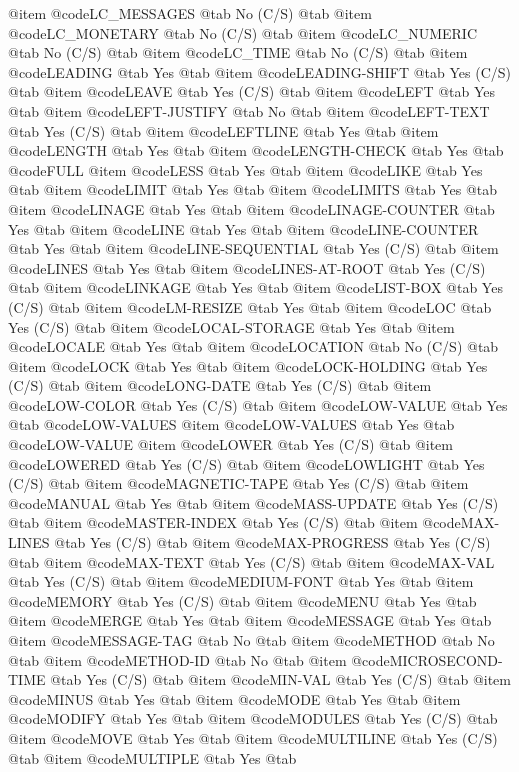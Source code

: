@item @code{LC_MESSAGES} @tab No	(C/S) @tab 
@item @code{LC_MONETARY} @tab No	(C/S) @tab 
@item @code{LC_NUMERIC} @tab No	(C/S) @tab 
@item @code{LC_TIME} @tab No	(C/S) @tab 
@item @code{LEADING} @tab Yes @tab 
@item @code{LEADING-SHIFT} @tab Yes	(C/S) @tab 
@item @code{LEAVE} @tab Yes	(C/S) @tab 
@item @code{LEFT} @tab Yes @tab 
@item @code{LEFT-JUSTIFY} @tab No @tab 
@item @code{LEFT-TEXT} @tab Yes	(C/S) @tab 
@item @code{LEFTLINE} @tab Yes @tab 
@item @code{LENGTH} @tab Yes @tab 
@item @code{LENGTH-CHECK} @tab Yes @tab @code{FULL}
@item @code{LESS} @tab Yes @tab 
@item @code{LIKE} @tab Yes @tab 
@item @code{LIMIT} @tab Yes @tab 
@item @code{LIMITS} @tab Yes @tab 
@item @code{LINAGE} @tab Yes @tab 
@item @code{LINAGE-COUNTER} @tab Yes @tab 
@item @code{LINE} @tab Yes @tab 
@item @code{LINE-COUNTER} @tab Yes @tab 
@item @code{LINE-SEQUENTIAL} @tab Yes	(C/S) @tab 
@item @code{LINES} @tab Yes @tab 
@item @code{LINES-AT-ROOT} @tab Yes	(C/S) @tab 
@item @code{LINKAGE} @tab Yes @tab 
@item @code{LIST-BOX} @tab Yes	(C/S) @tab 
@item @code{LM-RESIZE} @tab Yes @tab 
@item @code{LOC} @tab Yes	(C/S) @tab 
@item @code{LOCAL-STORAGE} @tab Yes @tab 
@item @code{LOCALE} @tab Yes @tab 
@item @code{LOCATION} @tab No	(C/S) @tab 
@item @code{LOCK} @tab Yes @tab 
@item @code{LOCK-HOLDING} @tab Yes	(C/S) @tab 
@item @code{LONG-DATE} @tab Yes	(C/S) @tab 
@item @code{LOW-COLOR} @tab Yes	(C/S) @tab 
@item @code{LOW-VALUE} @tab Yes @tab @code{LOW-VALUES}
@item @code{LOW-VALUES} @tab Yes @tab @code{LOW-VALUE}
@item @code{LOWER} @tab Yes	(C/S) @tab 
@item @code{LOWERED} @tab Yes	(C/S) @tab 
@item @code{LOWLIGHT} @tab Yes	(C/S) @tab 
@item @code{MAGNETIC-TAPE} @tab Yes	(C/S) @tab 
@item @code{MANUAL} @tab Yes @tab 
@item @code{MASS-UPDATE} @tab Yes	(C/S) @tab 
@item @code{MASTER-INDEX} @tab Yes	(C/S) @tab 
@item @code{MAX-LINES} @tab Yes	(C/S) @tab 
@item @code{MAX-PROGRESS} @tab Yes	(C/S) @tab 
@item @code{MAX-TEXT} @tab Yes	(C/S) @tab 
@item @code{MAX-VAL} @tab Yes	(C/S) @tab 
@item @code{MEDIUM-FONT} @tab Yes @tab 
@item @code{MEMORY} @tab Yes	(C/S) @tab 
@item @code{MENU} @tab Yes @tab 
@item @code{MERGE} @tab Yes @tab 
@item @code{MESSAGE} @tab Yes @tab 
@item @code{MESSAGE-TAG} @tab No @tab 
@item @code{METHOD} @tab No @tab 
@item @code{METHOD-ID} @tab No @tab 
@item @code{MICROSECOND-TIME} @tab Yes	(C/S) @tab 
@item @code{MIN-VAL} @tab Yes	(C/S) @tab 
@item @code{MINUS} @tab Yes @tab 
@item @code{MODE} @tab Yes @tab 
@item @code{MODIFY} @tab Yes @tab 
@item @code{MODULES} @tab Yes	(C/S) @tab 
@item @code{MOVE} @tab Yes @tab 
@item @code{MULTILINE} @tab Yes	(C/S) @tab 
@item @code{MULTIPLE} @tab Yes @tab 
